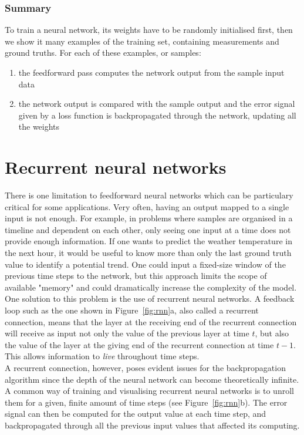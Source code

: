 \subsubsection{Summary}
To train a neural network, its weights have to be randomly initialised first,
then we show it many examples of the training set, containing measurements and
ground truths. For each of these examples, or samples:
\begin{enumerate}
	\item the feedforward pass computes the network output from the sample
		input data
	\item the network output is compared with the sample output and the
		error signal given by a loss function
		is backpropagated through the network, updating
		all the weights
\end{enumerate}


\section{Recurrent neural networks}
There is one limitation to feedforward neural networks which can be particulary
critical for some applications. Very often, having an output mapped to a 
single input is not enough. For example, in problems where samples are organised
in a timeline and dependent on each other, only seeing one input at a time
does not provide enough information. If one wants to predict the weather
temperature in the next hour, it would be useful to know more than only the
last ground truth value to identify a potential trend. One 
could input a fixed-size window of the previous time steps to the network,
but this approach limits the scope of available "memory" and could dramatically
increase the complexity of the model.\\

One solution to this problem is the use of recurrent neural networks.
A feedback loop such as the one shown in Figure~\ref{fig:rnn}a, also called
a recurrent connection, means that the layer at the receiving end of the
recurrent connection will receive as input not only the value of the previous
layer at time $t$, but also the value of the layer at the giving end of the 
recurrent connection at time $t-1$. This allows information to \textit{live}
throughout time steps.\\

A recurrent connection, however, poses evident issues for the backpropagation
algorithm since the depth of the neural network can become theoretically
infinite.  A common way of training and visualising recurrent neural networks 
is to unroll them for a given, finite amount of time steps (see 
Figure~\ref{fig:rnn}b).  The error signal can then be computed
for the output value at each time step, and backpropagated through all the
previous input values that affected its computing.\\

